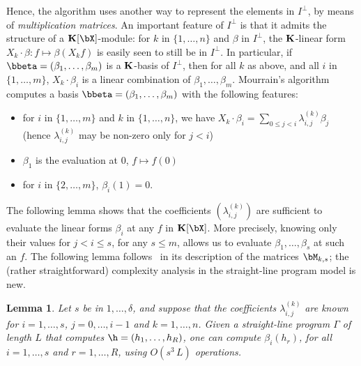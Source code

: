\documentclass[12pt]{article}
\newtheorem{lemma}[definition]{Lemma}
\begin{document}
Hence, the algorithm uses another way to represent the elements in
$I^{\perp}$, by means of {\em multiplication matrices}. An important
feature of $I^{\perp}$ is that it admits the structure of a
$\KK[\bX]$-module: for $k$ in $\{1,\dots,n\}$ and $\beta$ in
$I^{\perp}$, the $\mathbf{K}$-linear form $X_k \cdot \beta: f \mapsto
\beta(X_k f)$ is easily seen to still be in $I^{\perp}$.  In
particular, if $\bbeta=(\beta_1,\dots,\beta_m)$ is a $\mathbf{K}$-basis of
$I^{\perp}$, then for all $k$ as above, and all $i$ in
$\{1,\dots,m\}$, $X_k \cdot \beta_i$ is a linear combination of
$\beta_1,\dots,\beta_m$. Mourrain's algorithm computes a
basis $\bbeta=(\beta_1,\dots,\beta_m)$ with the following features:
\begin{itemize}
\item for $i$ in $\{1,\dots,m\}$ and $k$ in $\{1,\dots,n\}$, we have
  $X_k \cdot \beta_i=\sum_{0 \le j < i} \lambda^{(k)}_{i,j} \beta_j$
  (hence $\lambda^{(k)}_{i,j}$ may be non-zero 
  only for $j<i$)
\item $\beta_1$ is the evaluation at $0$, $f \mapsto f(0)$
\item for $i$ in $\{2,\dots,m\}$, $\beta_i(1)=0$.
\end{itemize}
The following lemma shows that the coefficients $(\lambda^{(k)}_{i,j})$
are sufficient to evaluate  the linear forms $\beta_i$ at any $f$ in
$\KK[\bX]$. More precisely, knowing only their values for $j < i \le s$,
for any $s \le m$, allows us to evaluate $\beta_1,\dots,\beta_s$ at such an $f$.
The following lemma follows~\cite{Mourrain97} in its description
of the matrices $\bM_{k,s}$; the (rather straightforward) complexity analysis 
in the straight-line program model is new.
\begin{lemma}\label{lemma:evalbeta}
   Let $s$ be in $1,\dots,\delta$, and suppose that the coefficients
  $\lambda^{(k)}_{i,j}$ are known for $i=1,\dots,s$, $j=0,\dots,i-1$
  and $k=1,\dots,n$. Given a straight-line program $\Gamma$ of length
  $L$ that computes $\h=(h_1,\dots,h_R)$, one can compute
  $\beta_i(h_r)$, for all $i=1,\dots,s$ and $r=1,\dots,R$, using
  $O(s^3\,L)$ operations.
\end{lemma}
\end{document}
